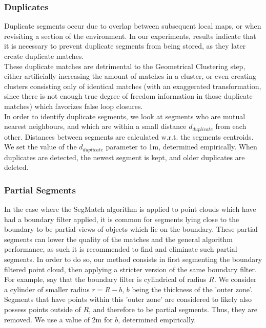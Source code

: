\subsubsection{Duplicates}
\label{subsub:sec:duplicates}

Duplicate segments occur due to overlap between subsequent local maps, or when revisiting a section of the environment.
In our experiments, results indicate that it is necessary to prevent duplicate segments from being stored, as they later create duplicate matches.\\ 

These duplicate matches are detrimental to the Geometrical Clustering step, either artificially increasing the amount of matches in a cluster, or even creating clusters consisting only of identical matches (with an exaggerated transformation, since there is not enough true degree of freedom information in those duplicate matches) which favorizes false loop closures.\\

In order to identify duplicate segments, we look at segments who are mutual nearest neighbours, and which are within a small distance $d_{duplicate}$ from each other. Distances between segments are calculated w.r.t. the segments centroids. We set the value of the $d_{duplicate}$ parameter to 1m, determined empirically. When duplicates are detected, the newest segment is kept, and older duplicates are deleted.\\

\subsubsection{Partial Segments}
\label{subsubsec:partial}

In the case where the SegMatch algorithm is applied to point clouds which have had a boundary filter applied, it is common for segments lying close to the boundary to be partial views of objects which lie on the boundary. 
These partial segments can lower the quality of the matches and the general algorithm performance, as such it is recommended to find and eliminate such partial segments. 
In order to do so, our method consists in first segmenting the boundary filtered point cloud, then applying a stricter version of the same boundary filter.\\

For example, say that the boundary filter is cylindrical of radius $R$. We consider a cylinder of smaller radius $r = R-b$, $b$ being the thickness of the 'outer zone'. Segments that have points within this 'outer zone' are considered to likely also possess points outside of $R$, and therefore to be partial segments. Thus, they are removed. We use a value of 2m for $b$, determined empirically.\\


